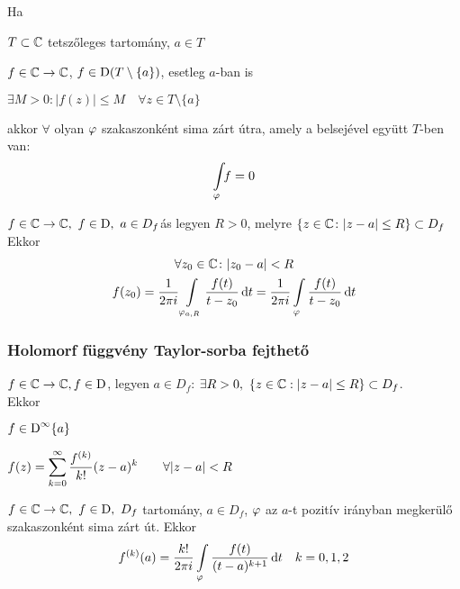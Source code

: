 \begin{lemma}[Riemann]Ha
  \begin{enumzjr}
    \item $T\subset \mathbb{C}$ tetszőleges tartomány, $a\in T$
    \item $f\in\mathbb{C}\to\mathbb{C}$, $f\in \operatorname{D}(T\setminus \{a\})$, esetleg $a$-ban is
    \item $\exists M>0\colon |f(z)| \leq M\quad \forall z\in T\setminus\{a\}$
  \end{enumzjr}
  akkor $\forall$ olyan $\varphi$ szakaszonként sima zárt útra, amely a belsejével együtt $T$-ben van:
  \[ \Int_\vfi\!\! f = 0\]
\end{lemma}


\begin{te}
  $f\in\mathbb{C}\to\mathbb{C},\ f\in\operatorname{D},\ a\in D_f$ás legyen $R>0$, melyre
  $\{z\in\mathbb{C}\colon |z-a|\leq R\}\subset D_f$\\
  Ekkor
  \begin{gather*}
    \forall z_0\in \C\colon |z_0-a|<R\\
    f(z_0) = \dfrac1{2\pi i}\Int_{\vfi_{a,R}} \dfrac{f(t)}{t-z_0} \diff t = \dfrac1{2\pi i}\Int_\vfi
    \dfrac{f(t)}{t-z_0}\diff t
  \end{gather*}
\end{te}
\subsubsection{Holomorf függvény Taylor-sorba fejthető}

\begin{te} $f\in\mathbb{C}\to\mathbb{C}, f\in\operatorname{D}$, legyen $a\in D_f$: $\exists R>0,\ \{z\in\mathbb{C} : |z-a| \leq R\}\subset D_f$.\\
  Ekkor
  \begin{enumzjr}
    \item $f\in\operatorname{D}^\infty\{a\}$
    \item $\displaystyle f(z)= \sum_{k=0}^\infty \dfrac{f^{(k)}}{k!}(z-a)^k\qquad\forall |z-a|<R$
  \end{enumzjr}  
\end{te}

\begin{kov}
  $f\in\mathbb{C}\to\mathbb{C},\ f\in\operatorname{D},\ D_f$ tartomány, $a\in D_f$, $\varphi$ az $a$-t pozitív irányban megkerülő szakaszonként sima
  zárt út. Ekkor
  \[ f^{(k)} (a) = \dfrac{k!}{2\pi i}\Int_\vfi \dfrac{f(t)}{(t-a)^{k+1}}\diff t\quad k=0,1,2\]
\end{kov}


